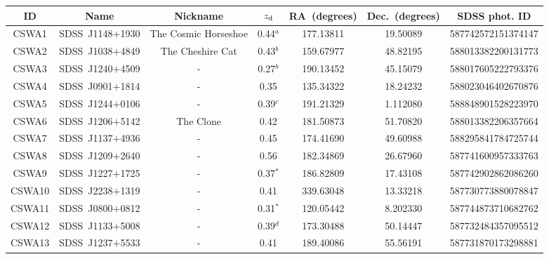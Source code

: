 \footnotesize
\renewcommand{\arraystretch}{1.2}
\begin{tabular*}{0.8\linewidth}{@{\extracolsep{\fill}}c c c c cc c}
\hline\hline
     ID  &  Name                &  Nickname              &  $z_{\rm d}{ }$        &  RA\ (degrees)  &  Dec.\ (degrees) &  SDSS phot. ID      \\ \hline
  CSWA1  &  SDSS\ J1148$+$1930  &  The Cosmic Horseshoe  &  0.44$^{a}$   &  177.13811      &  19.50089        &  587742572151374147 \\
  CSWA2  &  SDSS\ J1038$+$4849  &  The Cheshire Cat      &  0.43$^{b}$   &  159.67977      &  48.82195        &  588013382200131773 \\
  CSWA3  &  SDSS\ J1240$+$4509  &  -                     &  0.27$^{b}$   &  190.13452      &  45.15079        &  588017605222793376 \\
  CSWA4  &  SDSS\ J0901$+$1814  &  -                     &  0.35         &  135.34322      &  18.24232        &  588023046402670876 \\
  CSWA5  &  SDSS\ J1244$+$0106  &  -                     &  0.39$^{c}$   &  191.21329      &  1.112080        &  588848901528223970 \\
  CSWA6  &  SDSS\ J1206$+$5142  &  The Clone             &  0.42         &  181.50873      &  51.70820        &  588013382206357664 \\
  CSWA7  &  SDSS\ J1137$+$4936  &  -                     &  0.45         &  174.41690      &  49.60988        &  588295841784725744 \\
  CSWA8  &  SDSS\ J1209$+$2640  &  -                     &  0.56         &  182.34869      &  26.67960        &  587741600957333763 \\
  CSWA9  &  SDSS\ J1227$+$1725  &  -                     &  0.37$^{*}$   &  186.82809      &  17.43108        &  587742902862086260 \\
 CSWA10  &  SDSS\ J2238$+$1319  &  -                     &  0.41         &  339.63048      &  13.33218        &  587730773880078847 \\
 CSWA11  &  SDSS\ J0800$+$0812  &  -                     &  0.31$^{*}$   &  120.05442      &  8.202330        &  587744873710682762 \\
 CSWA12  &  SDSS\ J1133$+$5008  &  -                     &  0.39$^{d}$   &  173.30488      &  50.14447        &  587732484357095512 \\
 CSWA13  &  SDSS\ J1237$+$5533  &  -                     &  0.41         &  189.40086      &  55.56191        &  587731870173298881 \\

\end{tabular*}
